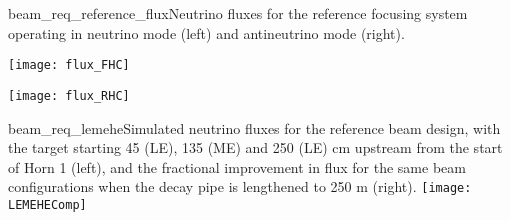 \begin{cdrfigure}{beam_req_reference_flux}{Neutrino fluxes for the reference 
    focusing system operating in neutrino mode (left) and antineutrino 
    mode (right).} 
\centering 
\begin{minipage}{0.45\textwidth}
\centering 
\texttt{[image: flux\_FHC]}
\end{minipage}\hfill 
\begin{minipage}{0.45\textwidth}
\centering 
\texttt{[image: flux\_RHC]}
\end{minipage}
\end{cdrfigure}
\begin{cdrfigure} {beam_req_lemehe}{Simulated neutrino fluxes for the 
    reference beam design, with the target starting 45 (LE), 135 (ME) 
    and 250 (LE) cm upstream from the start of Horn 1 (left), and the
    fractional improvement in flux for the same beam configurations 
    when the decay pipe is lengthened to 250 m (right).}
    \texttt{[image: LEMEHEComp]}
  \end{cdrfigure}
